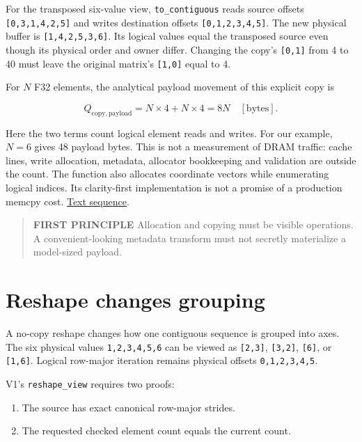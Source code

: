 
For the transposed six-value view, \texttt{to\_contiguous} reads source
offsets \texttt{{[}0,3,1,4,2,5{]}} and writes destination offsets
\texttt{{[}0,1,2,3,4,5{]}}. The new physical buffer is
\texttt{{[}1,4,2,5,3,6{]}}. Its logical values equal the transposed
source even though its physical order and owner differ. Changing the
copy's \texttt{{[}0,1{]}} from 4 to 40 must leave the original matrix's
\texttt{{[}1,0{]}} equal to 4.

For \(N\) F32 elements, the analytical payload movement of this explicit
copy is

\begin{equation}
Q_{\mathrm{copy,payload}}=N\times4+N\times4=8N\quad[\mathrm{bytes}].
\end{equation}

Here the two terms count logical element reads and writes. For our
example, \(N=6\) gives 48 payload bytes. This is not a measurement of
DRAM traffic: cache lines, write allocation, metadata, allocator
bookkeeping and validation are outside the count. The function also
allocates coordinate vectors while enumerating logical indices. Its
clarity-first implementation is not a promise of a production memcpy
cost.
\href{https://github.com/hermonai/inside-the-llm-engine/blob/astra-visual-rewrite/figures/generated/tensor-copy.txt}{Text
sequence}.

\begin{quote}
\textbf{FIRST PRINCIPLE} Allocation and copying must be visible
operations. A convenient-looking metadata transform must not secretly
materialize a model-sized payload.
\end{quote}

\section{Reshape changes grouping}\label{reshape-changes-grouping}

A no-copy reshape changes how one contiguous sequence is grouped into
axes. The six physical values \texttt{1,2,3,4,5,6} can be viewed as
\texttt{{[}2,3{]}}, \texttt{{[}3,2{]}}, \texttt{{[}6{]}}, or
\texttt{{[}1,6{]}}. Logical row-major iteration remains physical offsets
\texttt{0,1,2,3,4,5}.

V1's \texttt{reshape\_view} requires two proofs:

\begin{enumerate}
\def\labelenumi{\arabic{enumi}.}
\tightlist
\item
  The source has exact canonical row-major strides.
\item
  The requested checked element count equals the current count.
\end{enumerate}

